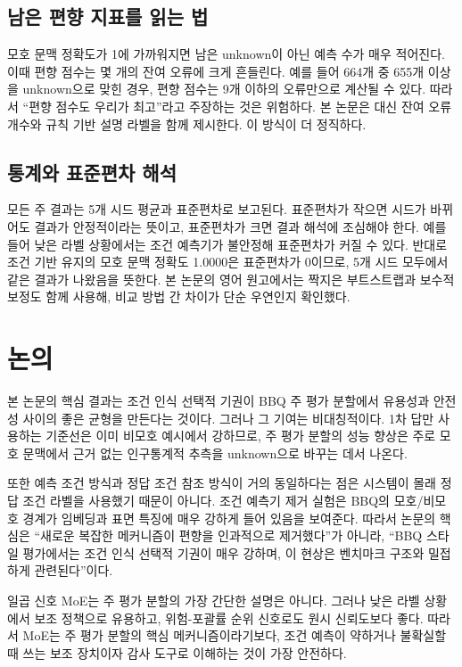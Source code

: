 \documentclass{ieeeaccess}
\begin{document}
\subsection{남은 편향 지표를 읽는 법}
모호 문맥 정확도가 1에 가까워지면 남은 unknown이 아닌 예측 수가 매우 적어진다. 이때 편향 점수는 몇 개의 잔여 오류에 크게 흔들린다. 예를 들어 664개 중 655개 이상을 unknown으로 맞힌 경우, 편향 점수는 9개 이하의 오류만으로 계산될 수 있다. 따라서 ``편향 점수도 우리가 최고''라고 주장하는 것은 위험하다. 본 논문은 대신 잔여 오류 개수와 규칙 기반 설명 라벨을 함께 제시한다. 이 방식이 더 정직하다.

\subsection{통계와 표준편차 해석}
모든 주 결과는 5개 시드 평균과 표준편차로 보고된다. 표준편차가 작으면 시드가 바뀌어도 결과가 안정적이라는 뜻이고, 표준편차가 크면 결과 해석에 조심해야 한다. 예를 들어 낮은 라벨 상황에서는 조건 예측기가 불안정해 표준편차가 커질 수 있다. 반대로 조건 기반 유지의 모호 문맥 정확도 1.0000은 표준편차가 0이므로, 5개 시드 모두에서 같은 결과가 나왔음을 뜻한다. 본 논문의 영어 원고에서는 짝지은 부트스트랩과 보수적 보정도 함께 사용해, 비교 방법 간 차이가 단순 우연인지 확인했다.

\section{논의}
\label{sec:discussion}

본 논문의 핵심 결과는 조건 인식 선택적 기권이 BBQ 주 평가 분할에서 유용성과 안전성 사이의 좋은 균형을 만든다는 것이다. 그러나 그 기여는 비대칭적이다. 1차 답만 사용하는 기준선은 이미 비모호 예시에서 강하므로, 주 평가 분할의 성능 향상은 주로 모호 문맥에서 근거 없는 인구통계적 추측을 unknown으로 바꾸는 데서 나온다.

또한 예측 조건 방식과 정답 조건 참조 방식이 거의 동일하다는 점은 시스템이 몰래 정답 조건 라벨을 사용했기 때문이 아니다. 조건 예측기 제거 실험은 BBQ의 모호/비모호 경계가 임베딩과 표면 특징에 매우 강하게 들어 있음을 보여준다. 따라서 논문의 핵심은 ``새로운 복잡한 메커니즘이 편향을 인과적으로 제거했다''가 아니라, ``BBQ 스타일 평가에서는 조건 인식 선택적 기권이 매우 강하며, 이 현상은 벤치마크 구조와 밀접하게 관련된다''이다.

일곱 신호 MoE는 주 평가 분할의 가장 간단한 설명은 아니다. 그러나 낮은 라벨 상황에서 보조 정책으로 유용하고, 위험-포괄률 순위 신호로도 원시 신뢰도보다 좋다. 따라서 MoE는 주 평가 분할의 핵심 메커니즘이라기보다, 조건 예측이 약하거나 불확실할 때 쓰는 보조 장치이자 감사 도구로 이해하는 것이 가장 안전하다.
\end{document}
